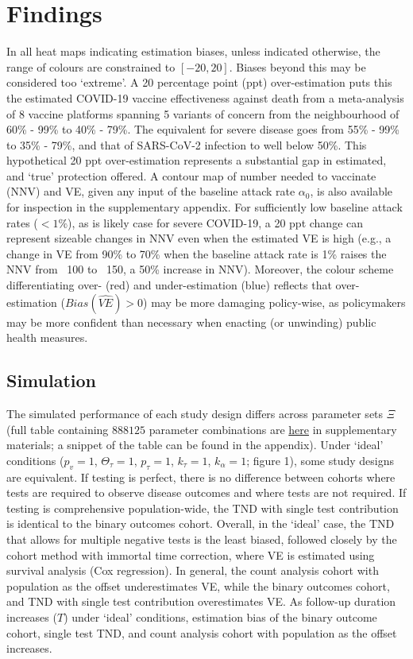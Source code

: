 \documentclass[12pt]{article}
\begin{document}
\section{Findings}
In all heat maps indicating estimation biases, unless indicated otherwise, the range of colours are constrained to $[-20, 20]$. Biases beyond this may be considered too `extreme'. A 20 percentage point (ppt) over-estimation puts this the estimated COVID-19 vaccine effectiveness against death from a meta-analysis of 8 vaccine platforms spanning 5 variants of concern \citep{higdon2022sysreview} from the neighbourhood of 60\% - 99\% to 40\% - 79\%. The equivalent for severe disease goes from 55\% - 99\% to 35\% - 79\%, and that of SARS-CoV-2 infection to well below 50\%. This hypothetical 20 ppt over-estimation represents a substantial gap in estimated, and `true' protection offered. A contour map of number needed to vaccinate (NNV) and VE, given any input of the baseline attack rate $\alpha_0$, is also available for inspection in the supplementary appendix. For sufficiently low baseline attack rates ($<1\%$), as is likely case for severe COVID-19, a 20 ppt change can represent sizeable changes in NNV even when the estimated VE is high (e.g., a change in VE from 90\% to 70\% when the baseline attack rate is 1\% raises the NNV from ~100 to ~150, a 50\% increase in NNV). Moreover, the colour scheme differentiating over- (red) and under-estimation (blue) reflects that over-estimation ($Bias(\widehat{VE}) > 0$) may be more damaging policy-wise, as policymakers may be more confident than necessary when enacting (or unwinding) public health measures.

\subsection{Simulation}

The simulated performance of each study design differs across parameter sets $\Xi$ (full table containing $888125$ parameter combinations are \href{https://www.dropbox.com/sh/7sxgwfymrbkexb9/AADc4E3wb-FEsMr7SMIRqH4Ba?dl=0}{here} in supplementary materials; a snippet of the table can be found in the appendix). Under `ideal' conditions ($p_v=1$, $\Theta_{\tau}=1$, $p_{\tau}=1$, $k_{\tau}=1$, $k_{\alpha}=1$; figure 1), some study designs are equivalent. If testing is perfect, there is no difference between cohorts where tests are required to observe disease outcomes and where tests are not required. If testing is comprehensive population-wide, the TND with single test contribution is identical to the binary outcomes cohort. Overall, in the `ideal' case, the TND that allows for multiple negative tests is the least biased, followed closely by the cohort method with immortal time correction, where VE is estimated using survival analysis (Cox regression). In general, the count analysis cohort with population as the offset underestimates VE, while the binary outcomes cohort, and TND with single test contribution overestimates VE. As follow-up duration increases ($T$) under `ideal' conditions, estimation bias of the binary outcome cohort, single test TND, and count analysis cohort with population as the offset increases. 
\end{document}
